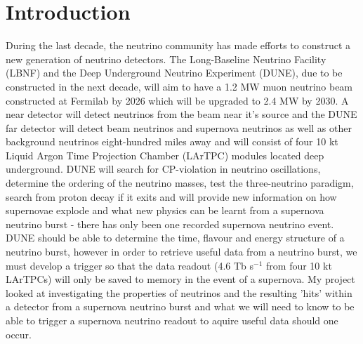 \documentclass[a4paper,12,oneside,notitlepage]{report}
\begin{document}
\section*{\fontsize{11}{11}\selectfont Introduction }
During the last decade, the neutrino community has made efforts to construct a new generation of neutrino detectors. The Long-Baseline Neutrino Facility (LBNF) and the Deep Underground Neutrino Experiment (DUNE), due to be constructed in the next decade, will aim to have a 1.2 MW muon neutrino beam constructed at Fermilab by 2026 which will be upgraded to 2.4 MW by 2030. A near detector will detect neutrinos from the beam near it's source and the DUNE far detector will detect beam neutrinos and supernova neutrinos as well as other background neutrinos eight-hundred miles away and will consist of four 10 kt Liquid Argon Time Projection Chamber (LArTPC) modules located deep underground. DUNE will search for CP-violation in neutrino oscillations, determine the ordering of the neutrino masses, test the three-neutrino paradigm, search from proton decay if it exits and will provide new information on how supernovae explode \cite{LBNEVol1} and what new physics can be learnt from a supernova neutrino burst - there has only been one recorded supernova neutrino event. DUNE should be able to determine the time, flavour and energy structure of a neutrino burst, however in order to retrieve useful data from a neutrino burst, we must develop a trigger so that the data readout (4.6 Tb s$^{-1}$ from four 10 kt LArTPCs) will only be saved to memory in the event of a supernova. My project looked at investigating the properties of neutrinos and the resulting 'hits' within a detector from a supernova neutrino burst and what we will need to know to be able to trigger a supernova neutrino readout to aquire useful data should one occur. 
\vspace{0.5cm}
\end{document}
